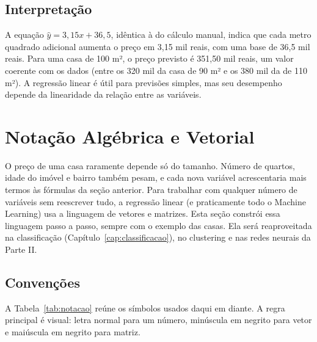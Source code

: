 \documentclass[a4paper,12pt,openany]{book}
\begin{document}
\vspace{5mm}

\subsection{Interpretação}
A equação \(\hat{y} = 3,15x + 36,5\), idêntica à do cálculo manual, indica que cada metro quadrado adicional aumenta o preço em 3,15 mil reais, com uma base de 36,5 mil reais. Para uma casa de 100 m², o preço previsto é 351,50 mil reais, um valor coerente com os dados (entre os 320 mil da casa de 90 m² e os 380 mil da de 110 m²). A regressão linear é útil para previsões simples, mas seu desempenho depende da linearidade da relação entre as variáveis.

\section{Notação Algébrica e Vetorial}\label{sec:notacao}

O preço de uma casa raramente depende só do tamanho. Número de quartos, idade do imóvel e bairro também pesam, e cada nova variável acrescentaria mais termos às fórmulas da seção anterior. Para trabalhar com qualquer número de variáveis sem reescrever tudo, a regressão linear (e praticamente todo o Machine Learning) usa a linguagem de vetores e matrizes. Esta seção constrói essa linguagem passo a passo, sempre com o exemplo das casas. Ela será reaproveitada na classificação (Capítulo~\ref{cap:classificacao}), no clustering e nas redes neurais da Parte II.

\subsection{Convenções}

A Tabela~\ref{tab:notacao} reúne os símbolos usados daqui em diante. A regra principal é visual: letra normal para um número, minúscula em negrito para vetor e maiúscula em negrito para matriz.
\end{document}
